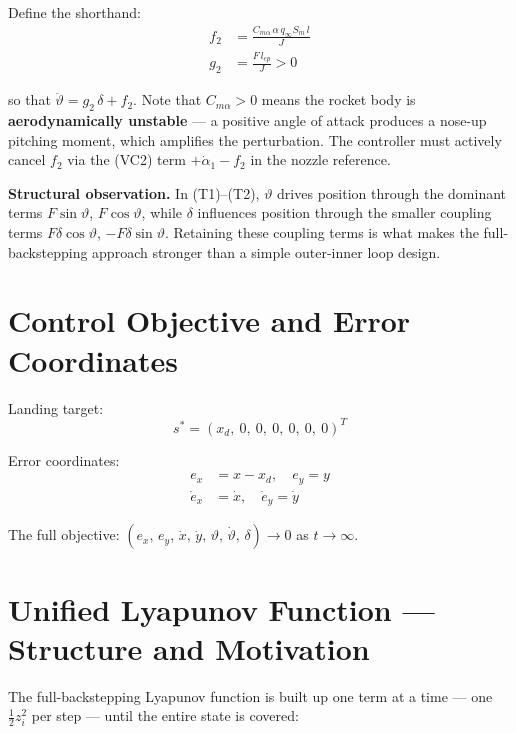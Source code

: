 \documentclass[11pt,a4paper]{article}
\theoremstyle{plain}
\theoremstyle{remark}
\newcommand{\vth}{\vartheta}
\begin{document}
Define the shorthand:
\begin{align}
  f_2 &= \frac{C_{m\alpha}\,\alpha\,q_\infty S_m\,l}{J} \\
  g_2 &= \frac{F\,l_{cp}}{J} > 0
\end{align}

so that $\ddot\vth = g_2\,\delta + f_2$. Note that $C_{m\alpha} > 0$ means the rocket body is \textbf{aerodynamically unstable} --- a positive angle of attack produces a nose-up pitching moment, which amplifies the perturbation. The controller must actively cancel $f_2$ via the (VC2) term $+\dot\alpha_1 - f_2$ in the nozzle reference.

\textbf{Structural observation.} In (T1)--(T2), $\vth$ drives position through the dominant terms $F\sin\vth$, $F\cos\vth$, while $\delta$ influences position through the smaller coupling terms $F\delta\cos\vth$, $-F\delta\sin\vth$. Retaining these coupling terms is what makes the full-backstepping approach stronger than a simple outer-inner loop design.

\section{Control Objective and Error Coordinates}

Landing target:
\[
  s^* = (x_d,\ 0,\ 0,\ 0,\ 0,\ 0,\ 0)^T
\]

Error coordinates:
\begin{align}
  e_x &= x - x_d, \quad e_y = y \\
  \dot e_x &= \dot x, \quad \dot e_y = \dot y
\end{align}

The full objective: $(e_x,\, e_y,\, \dot x,\, \dot y,\, \vth,\, \dot\vth,\, \delta) \to 0$ as $t \to \infty$.

\section{Unified Lyapunov Function --- Structure and Motivation}

The full-backstepping Lyapunov function is built up one term at a time --- one $\tfrac{1}{2}z_i^2$ per step --- until the entire state is covered:
\end{document}
